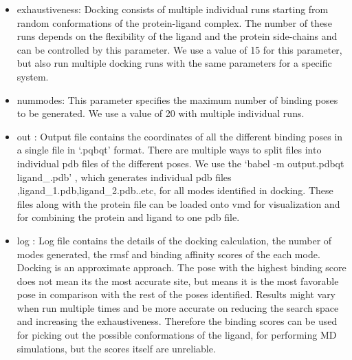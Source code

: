 \documentclass[12pt]{article}
\begin{document}
\begin{itemize}
\begin{itemize}
			\item exhaustiveness: Docking consists of multiple individual runs starting from random conformations of the protein-ligand complex. The number of these runs depends on the flexibility of the ligand and the protein side-chains and can be controlled  by this parameter. We use a value of 15 for this parameter, but also run multiple docking runs with the same parameters  for a specific system.
			\item nummodes: This parameter specifies the maximum number of binding poses to be generated. We use a value of 20 with multiple individual runs.
			\item out : Output file  contains the coordinates of all the different binding poses in a single file in `.pqbqt' format. There are multiple ways to split files into individual pdb files of the different poses. We use the `babel -m output.pdbqt ligand\_.pdb' , which generates individual pdb files ,ligand\_1.pdb,ligand\_2.pdb..etc, for all modes identified in docking. These files along with the protein file can be loaded onto vmd for visualization and for combining the protein and ligand to one pdb file. 
			\item log : Log file contains the details of the docking calculation, the number of modes generated, the rmsf and binding affinity scores of the each mode. Docking is an approximate approach. The pose with the highest binding score does not mean its the most accurate site, but means it is the most favorable pose in comparison with the rest of the poses identified. Results might vary when run multiple times and be more accurate on reducing the search space and increasing the exhaustiveness. Therefore the binding scores can be used for picking out the possible conformations of the ligand, for performing MD simulations, but the scores itself are unreliable.
\end{itemize}
\end{itemize}
\end{document}
